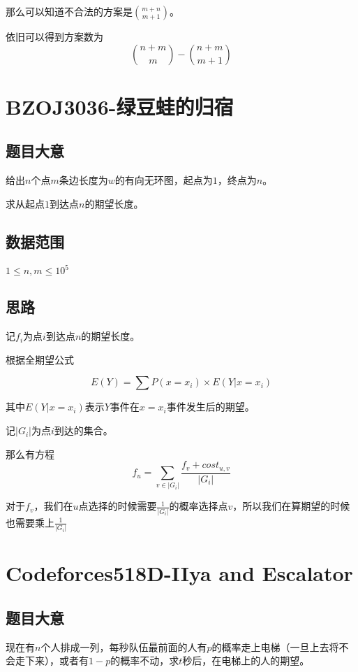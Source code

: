 \documentclass{ctexart}
\numberwithin{equation}{section}
\begin{document}
\begin{flushleft}
  那么可以知道不合法的方案是$\binom{m+n}{m+1}$。

  依旧可以得到方案数为$$\binom{n+m}{m}-\binom{n+m}{m+1}$$

  \section{BZOJ3036-绿豆蛙的归宿}
  \subsection{题目大意}
  给出$n$个点$m$条边长度为$w$的有向无环图，起点为$1$，终点为$n$。

  求从起点$1$到达点$n$的期望长度。
  
  \subsection{数据范围}
  $1\le n,m \le 10^5$
  \subsection{思路}
  
  记$f_i$为点$i$到达点$n$的期望长度。

  根据全期望公式
  
  $$E(Y)=\sum P(x=x_i)\times E(Y|x=x_i)$$

  其中$E(Y|x=x_i)$表示$Y$事件在$x=x_i$事件发生后的期望。

  记$|G_i|$为点$i$到达的集合。

  那么有方程$$f_u=\sum_{v\in |G_i|} \frac{f_v+cost_{u,v}}{|G_i|}$$

  对于$f_v$，我们在$u$点选择的时候需要$\frac{1}{|G_i|}$的概率选择点$v$，所以我们在算期望的时候也需要乘上$\frac{1}{|G_i|}$
  \newpage

  \section{Codeforces518D-IIya and Escalator}
  \subsection{题目大意}
  现在有$n$个人排成一列，每秒队伍最前面的人有$p$的概率走上电梯（一旦上去将不会走下来），或者有$1-p$的概率不动，求$t$秒后，在电梯上的人的期望。
  
  

\end{flushleft}
\end{document}
